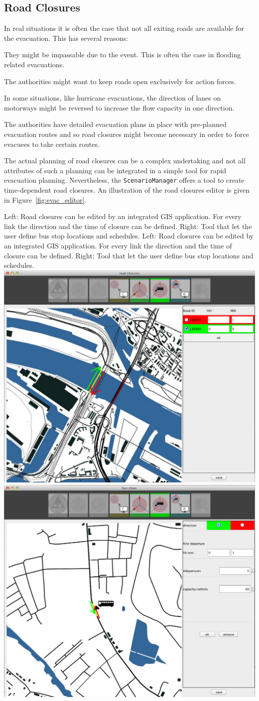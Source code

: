 \subsection{Road Closures}
In real situations it is often the case that not all exiting roads are available for the evacuation. This has several reasons:
\begin{compactitem}
\item They might be impassable due to the event. This is often the case in flooding related evacuations.
\item The authorities might want to keep roads open exclusively for action forces.
\item In some situations, like hurricane evacuations, the direction of lanes on motorways might be reversed to increase the flow capacity in one direction.
\item The authorities have detailed evacuation plans in place with pre-planned evacuation routes and so road closures might become necessary in order to force evacuees to take certain routes.
\end{compactitem}
The actual planning of road closures can be a complex undertaking and not all attributes of such a planning can be integrated in a simple tool for rapid evacuation planning. Nevertheless, the \lstinline|ScenarioManager| offers a tool to create time-dependent road closures. An illustration of the road closures editor is given in Figure~\ref{fig:evac_editor}.

\createfigure%
{Left: Road closures can be edited by an integrated GIS application. For every link the direction and the time of closure can be defined. Right: Tool that let the user define bus stop locations and schedules.}%
{Left: Road closures can be edited by an integrated GIS application. For every link the direction and the time of closure can be defined. Right: Tool that let the user define bus stop locations and schedules.}%
{\label{fig:evac_editor}}%
{%
  \createsubfigure%
  {}%
{\includegraphics[width=.475\linewidth]{extending/figures/Evacuation/rd_closure_detail}}
  {}%
  {}%
  \createsubfigure%
  {}%
{\includegraphics[width=.475\linewidth]{extending/figures/Evacuation/bus_stops}}
  {}%
  {}%
}%
  {}%

